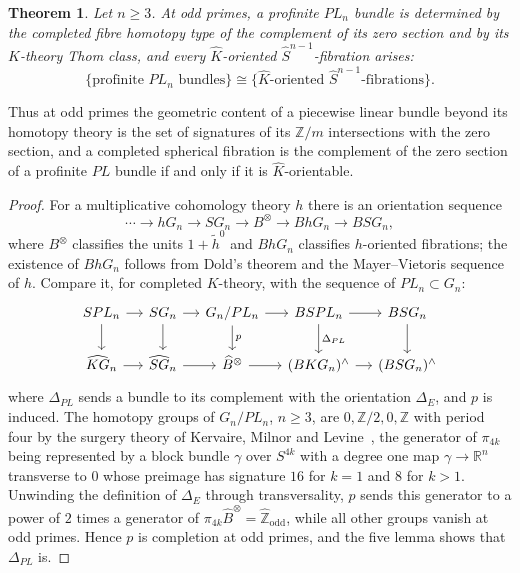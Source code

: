 \documentclass[11pt]{amsart}
\theoremstyle{plain}
\newtheorem{theorem}{Theorem}[section]
\theoremstyle{definition}
\numberwithin{equation}{section}
\newcommand{\Z}{\mathbb{Z}}
\newcommand{\R}{\mathbb{R}}
\newcommand{\Zhat}{\widehat{\mathbb{Z}}}
\begin{document}
\begin{theorem}\label{thm:PLprofinite}
Let $n\ge3$.
At odd primes, a profinite $PL_n$ bundle is determined by the completed fibre homotopy type of the complement of its zero section and by its $K$-theory Thom class, and every $\widehat K$-oriented $\widehat S^{n-1}$-fibration arises:
\[
\{\text{profinite }PL_n\text{ bundles}\}\cong\{\widehat K\text{-oriented }\widehat S^{n-1}\text{-fibrations}\}.
\]
\end{theorem}

Thus at odd primes the geometric content of a piecewise linear bundle beyond its homotopy theory is the set of signatures of its $\Z/m$ intersections with the zero section, and a completed spherical fibration is the complement of the zero section of a profinite $PL$ bundle if and only if it is $\widehat K$-orientable.

\begin{proof}
For a multiplicative cohomology theory $h$ there is an orientation sequence
\[
\cdots\to hG_n\to SG_n\to B^\otimes\to BhG_n\to BSG_n,
\]
where $B^\otimes$ classifies the units $1+\widetilde h^0$ and $BhG_n$ classifies $h$-oriented fibrations; the existence of $BhG_n$ follows from Dold's theorem and the Mayer--Vietoris sequence of $h$.
Compare it, for completed $K$-theory, with the sequence of $PL_n\subset G_n$:
\[
\begin{tikzcd}[column sep=small]
SPL_n\arrow[r]\arrow[d] & SG_n\arrow[r]\arrow[d] & G_n/PL_n\arrow[r]\arrow[d,"p"] & BSPL_n\arrow[r]\arrow[d,"\Delta_{PL}"] & BSG_n\arrow[d]\\
\widehat{KG}_n\arrow[r] & \widehat{SG}_n\arrow[r] & \widehat B^\otimes\arrow[r] & (BKG_n)^\wedge\arrow[r] & (BSG_n)^\wedge
\end{tikzcd}
\]
where $\Delta_{PL}$ sends a bundle to its complement with the orientation $\Delta_E$, and $p$ is induced.
The homotopy groups of $G_n/PL_n$, $n\ge3$, are $0,\Z/2,0,\Z$ with period four by the surgery theory of Kervaire, Milnor and Levine~\cite{KervaireMilnor}, the generator of $\pi_{4k}$ being represented by a block bundle $\gamma$ over $S^{4k}$ with a degree one map $\gamma\to\R^n$ transverse to $0$ whose preimage has signature $16$ for $k=1$ and $8$ for $k>1$.
Unwinding the definition of $\Delta_E$ through transversality, $p$ sends this generator to a power of $2$ times a generator of $\pi_{4k}\widehat B^\otimes=\Zhat_{\mathrm{odd}}$, while all other groups vanish at odd primes.
Hence $p$ is completion at odd primes, and the five lemma shows that $\Delta_{PL}$ is.
\end{proof}
\end{document}
